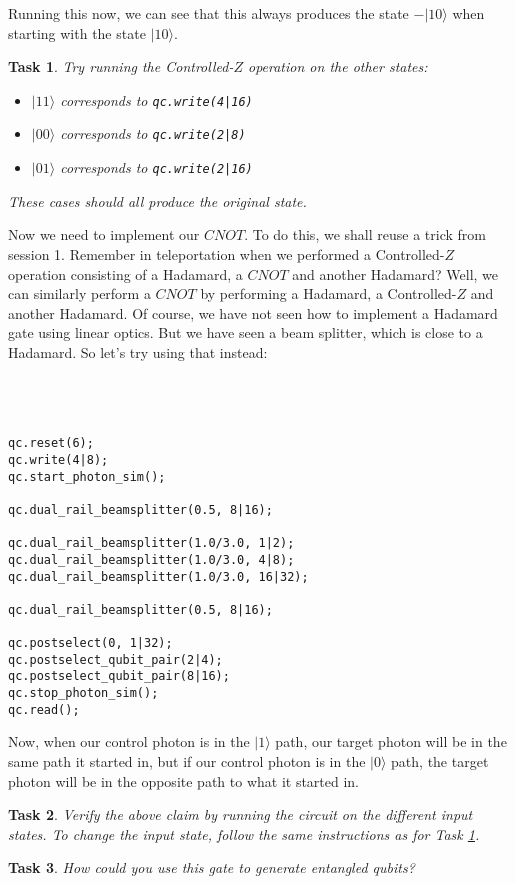 \documentclass[twocolumn]{article}
\newtheorem{task}{Task}[section]
\begin{document}
Running this now, we can see that this always produces the state $-|10\rangle$ when starting with the state $|10\rangle$.

\begin{task}
\label{task:cz}
Try running the Controlled-$Z$ operation on the other states:
\begin{itemize}
\item $|11\rangle$ corresponds to \texttt{qc.write(4|16)}
\item $|00\rangle$ corresponds to \texttt{qc.write(2|8)}
\item $|01\rangle$ corresponds to \texttt{qc.write(2|16)}
\end{itemize}

These cases should all produce the original state.
\end{task}

Now we need to implement our $CNOT$. To do this, we shall reuse a trick from session 1. Remember in teleportation when we performed a Controlled-$Z$ operation consisting of a Hadamard, a $CNOT$ and another Hadamard? Well, we can similarly perform a $CNOT$ by performing a Hadamard, a Controlled-$Z$ and another Hadamard. Of course, we have not seen how to implement a Hadamard gate using linear optics. But we have seen a beam splitter, which is close to a Hadamard. So let's try using that instead:
\\\\\\\\
\begin{lstlisting}
qc.reset(6);
qc.write(4|8);
qc.start_photon_sim();

qc.dual_rail_beamsplitter(0.5, 8|16);

qc.dual_rail_beamsplitter(1.0/3.0, 1|2);
qc.dual_rail_beamsplitter(1.0/3.0, 4|8);
qc.dual_rail_beamsplitter(1.0/3.0, 16|32);

qc.dual_rail_beamsplitter(0.5, 8|16);

qc.postselect(0, 1|32);
qc.postselect_qubit_pair(2|4);
qc.postselect_qubit_pair(8|16);
qc.stop_photon_sim();
qc.read();
\end{lstlisting}

Now, when our control photon is in the $|1\rangle$ path, our target photon will be in the same path it started in, but if our control photon is in the $|0\rangle$ path, the target photon will be in the opposite path to what it started in.

\begin{task}
Verify the above claim by running the circuit on the different input states. To change the input state, follow the same instructions as for Task \ref{task:cz}.
\end{task}

\begin{task}
How could you use this gate to generate entangled qubits?
\end{task}
\end{document}
